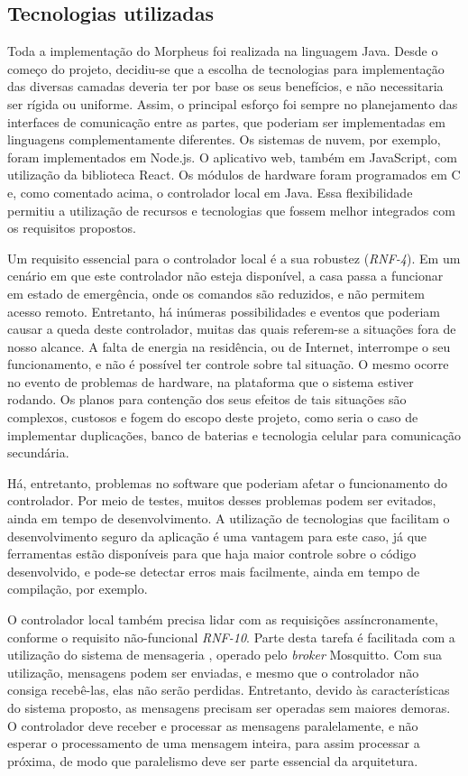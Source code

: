 \subsection{Tecnologias utilizadas}
Toda a implementação do Morpheus foi realizada na linguagem Java. Desde o começo do projeto, decidiu-se que a escolha de tecnologias para implementação das diversas camadas deveria ter por base os seus benefícios, e não necessitaria ser rígida ou uniforme. Assim, o principal esforço foi sempre no planejamento das interfaces de comunicação entre as partes, que poderiam ser implementadas em linguagens complementamente diferentes. Os sistemas de nuvem, por exemplo, foram implementados em Node.js. O aplicativo web, também em JavaScript, com utilização da biblioteca React. Os módulos de hardware foram programados em C e, como comentado acima, o controlador local em Java.
Essa flexibilidade permitiu a utilização de recursos e tecnologias que fossem melhor integrados com os requisitos propostos.

Um requisito essencial para o controlador local é a sua robustez (\emph{RNF-4}). Em um cenário em que este controlador não esteja disponível, a casa passa a funcionar em estado de emergência, onde os comandos são reduzidos, e não permitem acesso remoto. Entretanto, há inúmeras possibilidades e eventos que poderiam causar a queda deste controlador, muitas das quais referem-se a situações fora de nosso alcance. A falta de energia na residência, ou de Internet, interrompe o seu funcionamento, e não é possível ter controle sobre tal situação. O mesmo ocorre no evento de problemas de hardware, na plataforma que o sistema estiver rodando. Os planos para contenção dos seus efeitos de tais situações são complexos, custosos e fogem do escopo deste projeto, como seria o caso de implementar duplicações, banco de baterias e tecnologia celular para comunicação secundária.

Há, entretanto, problemas no software que poderiam afetar o funcionamento do controlador. Por meio de testes, muitos desses problemas podem ser evitados, ainda em tempo de desenvolvimento. A utilização de tecnologias que facilitam o desenvolvimento seguro da aplicação é uma vantagem para este caso, já que ferramentas estão disponíveis para que haja maior controle sobre o código desenvolvido, e pode-se detectar erros mais facilmente, ainda em tempo de compilação, por exemplo.

O controlador local também precisa lidar com as requisições assíncronamente, conforme o requisito não-funcional \emph{RNF-10}. Parte desta tarefa é facilitada com a utilização do sistema de mensageria \wmqtt{}, operado pelo \emph{broker} Mosquitto. Com sua utilização, mensagens podem ser enviadas, e mesmo que o controlador não consiga recebê-las, elas não serão perdidas. Entretanto, devido às características do sistema proposto, as mensagens precisam ser operadas sem maiores demoras. O controlador deve receber e processar as mensagens paralelamente, e não esperar o processamento de uma mensagem inteira, para assim processar a próxima, de modo que paralelismo deve ser parte essencial da arquitetura.


